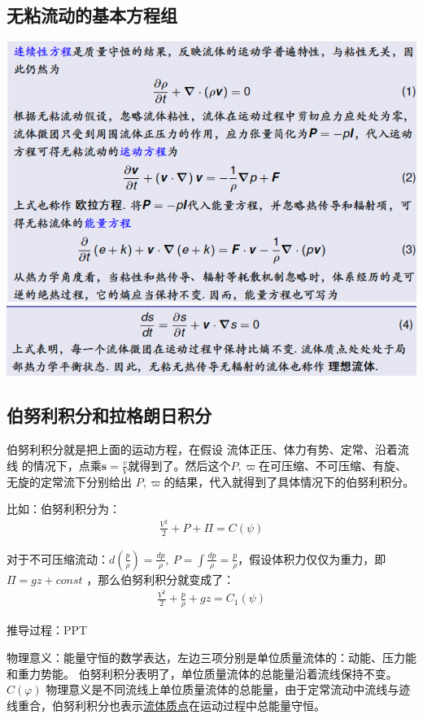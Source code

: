 \documentclass[UTF8,12pt]{article}
\begin{document}
\subsection{无粘流动的基本方程组}

\begin{center}
    \includegraphics[width=0.8\linewidth]{img/equation1.png}
    \includegraphics[width=0.8\linewidth]{img/equation2.png}
\end{center}

\subsection{伯努利积分和拉格朗日积分}

伯努利积分就是把上面的运动方程，在假设{\color{red} 流体正压、体力有势、定常、沿着流线 }的情况下，点乘$\boldsymbol s = \frac{v}{V}$就得到了。然后这个$P, \varpi$在可压缩、不可压缩、有旋、无旋的定常流下分别给出
$P, \varpi$的结果，代入就得到了具体情况下的伯努利积分。

比如：伯努利积分为：
\begin{align*}
    \frac{V^2}{2} + P + \Pi = C(\psi)
\end{align*}

对于不可压缩流动：$ d(\frac{p}{\rho}) = \frac{dp}{\rho},~ P = \int \frac{dp}{\rho} = \frac{p}{\rho}$，假设体积力仅仅为重力，即$\Pi = gz + const$
，那么伯努利积分就变成了：
\begin{align*}
    \frac{V^2}{2} + \frac{p}{\rho} + gz = C_1(\psi)
\end{align*}

推导过程：PPT

物理意义：能量守恒的数学表达，左边三项分别是单位质量流体的：动能、压力能和重力势能。
伯努利积分表明了，单位质量流体的总能量沿着流线保持不变。$C(\varphi)$
物理意义是不同流线上单位质量流体的总能量，由于定常流动中流线与迹线重合，伯努利积分也表示\uline{流体质点}在运动过程中总能量守恒。
\end{document}
